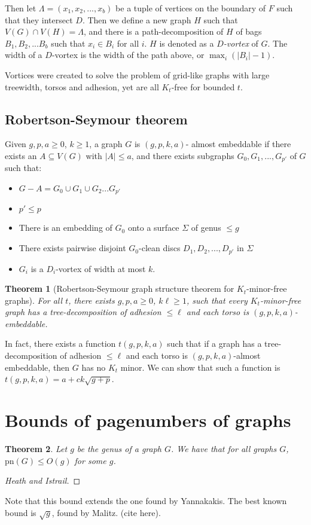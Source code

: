 \documentclass[]{article}
\newcommand{\pn}{\text{pn}}
\newtheorem{theorem}{Theorem}
\theoremstyle{definition}
\numberwithin{theorem}{section}
\numberwithin{equation}{section}
\begin{document}
Then let $\Lambda = (x_1, x_2, ..., x_b)$ be a tuple of vertices on the boundary of $F$ such that they intersect $D$. Then we define a new graph $H$ such that $V(G) \cap V(H) = \Lambda$, and there is a path-decomposition of $H$ of bags $B_1, B_2, ... B_b$ such that $x_i \in B_i$ for all $i$. $H$ is denoted as a \textit{$D$-vortex} of $G$. The width of a $D$-vortex is the width of the path above, or $\max_i(|B_i| - 1)$. 

Vortices were created to solve the problem of grid-like graphs with large treewidth, torsos and adhesion, yet are all $K_t$-free for bounded $t$. 
\subsection{Robertson-Seymour theorem}
Given $g, p, a \geq 0$, $k \geq 1$, a graph $G$ is $(g, p, k, a)$- almost embeddable if there exists an $A \subseteq V(G)$ with $|A| \leq a$, and there exists subgraphs $G_0, G_1, ...,  G_{p'}$ of $G$ such that:
\begin{itemize}
	\item $G - A = G_0 \cup G_1 \cup G_2 ... G_{p'}$
	\item $p' \leq p$
	\item There is an embedding of $G_0$ onto a surface $\Sigma$ of genus $\leq g$
	\item There exists pairwise disjoint $G_0$-clean discs $D_1, D_2, ..., D_{p'}$ in $\Sigma$
	\item $G_i$ is a $D_i$-vortex of width at most $k$.
\end{itemize}

\begin{theorem}[Robertson-Seymour graph structure theorem for $K_t$-minor-free graphs]
	For all $t$, there exists $g, p, a \geq 0$, $k \ell \geq 1$, such that every $K_t$-minor-free graph has a tree-decomposition of adhesion $\leq \ell$ and each torso is $(g, p, k, a)$-embeddable. 
\end{theorem}
In fact, there exists a function $t(g, p, k, a)$ such that if a graph has a tree-decomposition of adhesion $\leq \ell$ and each torso is $(g, p, k, a)$-almost embeddable, then $G$ has no $K_t$ minor. We can show that such a function is $t(g, p, k, a) = a + ck \sqrt{g + p}$. 

\section{Bounds of pagenumbers of graphs}
\begin{theorem}
	Let $g$ be the genus of a graph $G$. We have that for all graphs $G$, $\pn(G) \leq O(g)$ for some $g$.
\end{theorem}
\begin{proof}[Heath and Istrail]
	
\end{proof}
Note that this bound extends the one found by Yannakakis. 
The best known bound is $\sqrt{g}$, found by Malitz. (cite here).
\end{document}
